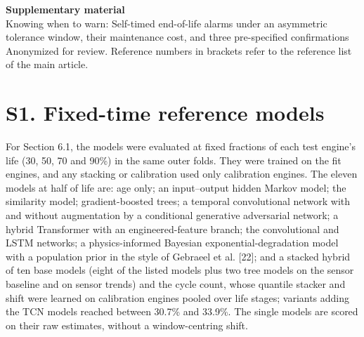 \documentclass[11pt,a4paper]{article}
\begin{document}
\begin{center}{\Large\bfseries Supplementary material}\\[6pt]{\large Knowing when to warn: Self-timed end-of-life alarms under an asymmetric tolerance window, their maintenance cost, and three pre-specified confirmations}\\[6pt]{\small Anonymized for review. Reference numbers in brackets refer to the reference list of the main article.}\end{center}
\section*{S1. Fixed-time reference models}

\noindent For Section 6.1, the models were evaluated at fixed fractions of each test engine's life (30, 50, 70 and 90\%) in the same outer folds. They were trained on the fit engines, and any stacking or calibration used only calibration engines. The eleven models at half of life are: age only; an input--output hidden Markov model; the similarity model; gradient-boosted trees; a temporal convolutional network with and without augmentation by a conditional generative adversarial network; a hybrid Transformer with an engineered-feature branch; the convolutional and LSTM networks; a physics-informed Bayesian exponential-degradation model with a population prior in the style of Gebraeel et al. [22]; and a stacked hybrid of ten base models (eight of the listed models plus two tree models on the sensor baseline and on sensor trends) and the cycle count, whose quantile stacker and shift were learned on calibration engines pooled over life stages; variants adding the TCN models reached between 30.7\% and 33.9\%. The single models are scored on their raw estimates, without a window-centring shift.
\end{document}
